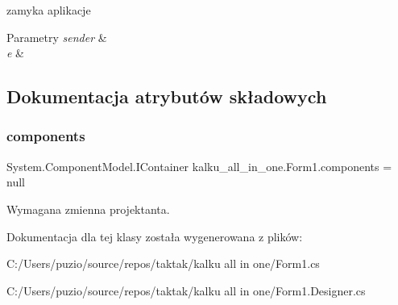 zamyka aplikacje 


\begin{DoxyParams}{Parametry}
{\em sender} & \\
\hline
{\em e} & \\
\hline
\end{DoxyParams}


\subsection{Dokumentacja atrybutów składowych}
\mbox{\label{classkalku__all__in__one_1_1_form1_a6435b7f5e458b4998b1dd1be91d3773d}} 
\subsubsection{\texorpdfstring{components}{components}}
{\footnotesize\ttfamily System.\+Component\+Model.\+I\+Container kalku\+\_\+all\+\_\+in\+\_\+one.\+Form1.\+components = null\hspace{0.3cm}{\ttfamily [private]}}



Wymagana zmienna projektanta. 



Dokumentacja dla tej klasy została wygenerowana z plików\+:\begin{DoxyCompactItemize}
\item 
C\+:/\+Users/puzio/source/repos/taktak/kalku all in one/Form1.\+cs\item 
C\+:/\+Users/puzio/source/repos/taktak/kalku all in one/Form1.\+Designer.\+cs\end{DoxyCompactItemize}
